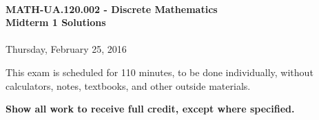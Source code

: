 \documentclass[12pt]{article}
\begin{document}
\thispagestyle{firststyle}
~
\vspace{0.5cm}

\begin{center}
\textbf{\Large MATH-UA.120.002 - Discrete Mathematics \\ \vspace{0.5cm} Midterm 1 Solutions}\\~\\
Thursday, February 25, 2016
\end{center}

\vspace{1cm}


\vspace{1cm}

\noindent
This exam is scheduled for 110 minutes, to be done individually, without calculators, notes, textbooks, and other outside materials.
\vspace{0.5cm}

\noindent
\textbf{Show all work to receive full credit, except where specified.}

\vspace{1cm}
\end{document}
